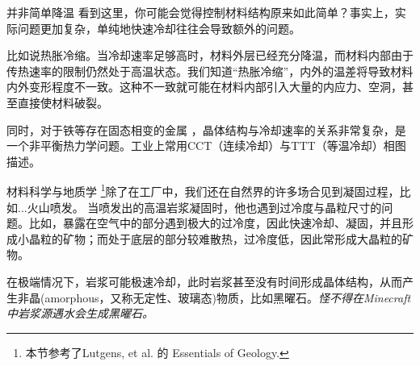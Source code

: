 \begin{example}{并非简单降温}
看到这里，你可能会觉得控制材料结构原来如此简单？事实上，实际问题更加复杂，单纯地快速冷却往往会导致额外的问题。

比如说热胀冷缩。当冷却速率足够高时，材料外层已经充分降温，而材料内部由于传热速率的限制仍然处于高温状态。我们知道“热胀冷缩”，内外的温差将导致材料内外变形程度不一致。这种不一致就可能在材料内部引入大量的内应力、空洞，甚至直接使材料破裂。

同时，对于铁等存在固态相变的金属  ，晶体结构与冷却速率的关系非常复杂，是一个非平衡热力学问题。工业上常用CCT（连续冷却）与TTT（等温冷却）相图描述。
\end{example}

\begin{example}{材料科学与地质学}
\footnote{本节参考了Lutgens, et al. 的 Essentials of Geology.}除了在工厂中，我们还在自然界的许多场合见到凝固过程，比如...火山喷发。
当喷发出的高温岩浆凝固时，他也遇到过冷度与晶粒尺寸的问题。比如，暴露在空气中的部分遇到极大的过冷度，因此快速冷却、凝固，并且形成小晶粒的矿物；而处于底层的部分较难散热，过冷度低，因此常形成大晶粒的矿物。

在极端情况下，岩浆可能极速冷却，此时岩浆甚至没有时间形成晶体结构，从而产生非晶(amorphous，又称无定性、玻璃态)物质，比如黑曜石。\textsl{怪不得在Minecraft中岩浆源遇水会生成黑曜石。}
\end{example}
